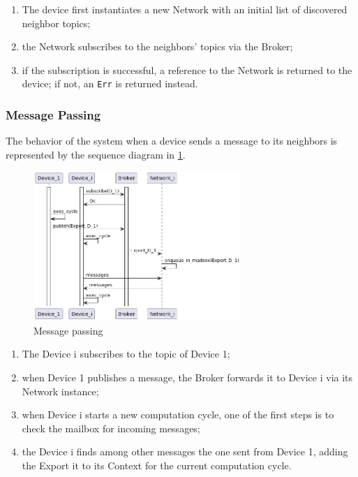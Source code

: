 \begin{enumerate}
    \item The device first instantiates a new Network with an initial list of discovered neighbor topics;
    \item the Network subscribes to the neighbors' topics via the Broker;
    \item if the subscription is successful, a reference to the Network is returned to the device; if not, an \texttt{Err} is returned instead.
\end{enumerate}

\subsubsection{Message Passing}
The behavior of the system when a device sends a message to its neighbors is represented by the sequence diagram in \cref{fig:message-passing}.

\begin{figure}[ht!]
    \centering
    \includegraphics[width=0.7\textwidth]{figures/diagrams/img/activity-message-passing.png}
    \caption{Message passing}
    \label{fig:message-passing}
\end{figure}

\begin{enumerate}
    \item The Device i subscribes to the topic of Device 1;
    \item when Device 1 publishes a message, the Broker forwards it to Device i via its Network instance;
    \item when Device i starts a new computation cycle, one of the first steps is to check the mailbox for incoming messages;
    \item the Device i finds among other messages the one sent from Device 1, adding the Export it to its Context for the current computation cycle.
\end{enumerate}
